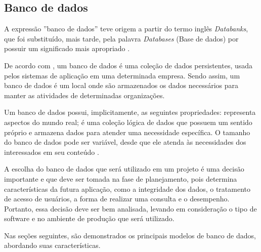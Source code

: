 \subsection{Banco de dados}

\par A expressão ''banco de dados'' teve origem a partir do termo inglês \textit{Databanks}, que foi substituído, mais tarde, pela palavra \textit{Databases} (Base de dados)  por possuir um significado mais apropriado \cite {setzer_silva_banco_dados_aprenda_o_que_sao_melhore_conhecimento}.

\par De acordo com , um banco de dados é uma coleção de dados persistentes, usada pelos sistemas de aplicação em uma determinada empresa. Sendo assim, um banco de dados é um local onde são armazenados os dados necessários para manter as atividades de determinadas organizações.

\par Um banco de dados possui, implicitamente, as seguintes propriedades: representa aspectos do mundo real; é uma coleção lógica de dados que possuem um sentido próprio e armazena dados para atender uma necessidade específica. O tamanho do banco de dados pode ser variável, desde que ele atenda às necessidades dos interessados em seu conteúdo \cite{elmasri_navathe_sistemas_banco_dados}.

\par A escolha do banco de dados que será utilizado em um projeto é uma decisão importante e que deve ser tomada na fase de planejamento, pois determina características da futura aplicação, como a integridade dos dados, o tratamento de acesso de usuários, a forma de realizar uma consulta e o desempenho. Portanto, essa decisão deve ser bem analisada, levando em consideração o tipo de software e no ambiente de produção que será utilizado.

\par Nas seções seguintes, são demonstrados os principais modelos de banco de dados, abordando suas características.